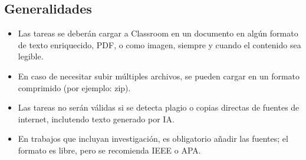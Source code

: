 \documentclass[11pt,letterpaper]{article}
\begin{document}
\subsection*{Generalidades}
\begin{itemize}
    \item Las tareas se deberán cargar a Classroom en un documento en algún formato de texto enriquecido, PDF, o como imagen, siempre y cuando el contenido sea legible.
    \item En caso de necesitar subir múltiples archivos, se pueden cargar en un formato comprimido (por ejemplo: zip).
    \item Las tareas no serán válidas si se detecta plagio o copias directas de fuentes de internet, inclutendo texto generado por IA. 
    \item En trabajos que incluyan investigación, es obligatorio añadir las fuentes; el formato es libre, pero se recomienda IEEE o APA.
\end{itemize}

    
    
    
    
  
\end{document}
